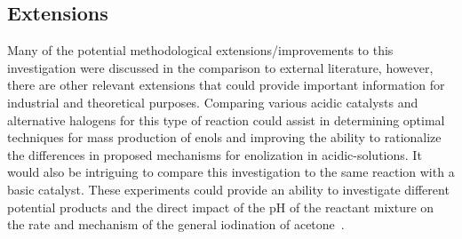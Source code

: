 \subsection{Extensions}

Many of the potential methodological extensions/improvements to this investigation were discussed in the comparison to external literature, however, there are other relevant extensions that could provide important information for industrial and theoretical purposes. Com{}paring various acidic catalysts and alternative halogens for this type of reaction could assist in determining optimal techniques for mass production of enols and improving the ability to rationalize the differences in proposed mechanisms for enolization in acidic-solutions. It would also be intriguing to compare this investigation to the same reaction with a basic catalyst. These experiments could provide an ability to investigate different potential products and the direct impact of the pH of the reactant mixture on the rate and mechanism of the general iodination of acetone~\parencite{base_catalyst}.